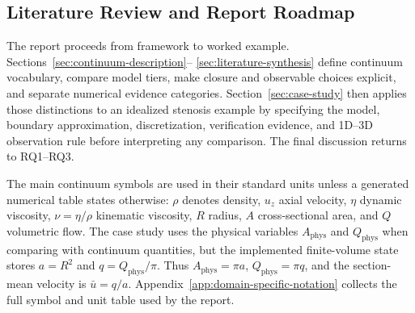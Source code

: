 \subsection{Literature Review and Report Roadmap}
\label{subsec:objectives-contributions}
\label{subsec:intro-notation-guide}
\label{subsec:report-organization}

The report proceeds from framework to worked example. Sections~\ref{sec:continuum-description}--%
\ref{sec:literature-synthesis} define continuum vocabulary, compare model tiers,
make closure and observable choices explicit, and separate numerical evidence
categories. Section~\ref{sec:case-study} then applies those distinctions to an
idealized stenosis example by specifying the model, boundary approximation,
discretization, verification evidence, and 1D--3D observation rule before
interpreting any comparison. The final discussion returns to RQ1--RQ3.

The main continuum symbols are used in their standard units unless a generated
numerical table states otherwise: $\rho$ denotes density, $u_z$ axial velocity,
$\eta$ dynamic viscosity, $\nu=\eta/\rho$ kinematic viscosity, $R$ radius,
$A$ cross-sectional area, and $Q$ volumetric flow. The case study uses the
physical variables $A_{\mathrm{phys}}$ and $Q_{\mathrm{phys}}$ when comparing
with continuum quantities, but the implemented finite-volume state stores
$a=R^2$ and $q=Q_{\mathrm{phys}}/\pi$. Thus
$A_{\mathrm{phys}}=\pi a$, $Q_{\mathrm{phys}}=\pi q$, and the section-mean
velocity is $\bar u=q/a$. Appendix~\ref{app:domain-specific-notation} collects
the full symbol and unit table used by the report.
